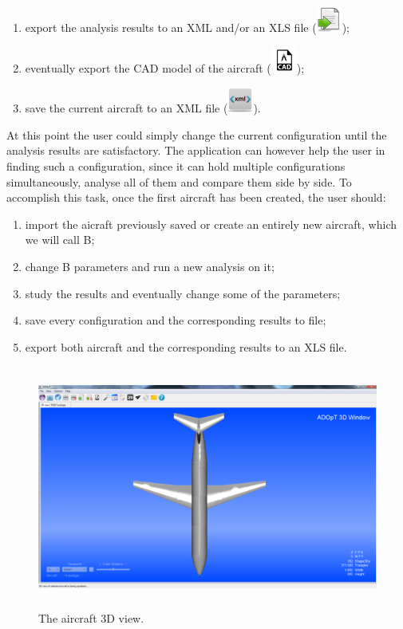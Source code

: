 \begin{enumerate}
	\item export the analysis results to an XML and/or an XLS file \big(\includegraphics[scale=0.4]{Immagini/gui/icons/Export_32x32.png}\big);
	
	\item eventually export the CAD model of the aircraft \big(\includegraphics[scale=1.2]{Immagini/gui/icons/cad_32x32.png}\big);
	\item save the current aircraft to an XML file \big(\includegraphics[scale=0.4]{Immagini/gui/icons/XML_32x32.png}\big).
\end{enumerate}

	
At this point the user could simply change the current configuration until the analysis results are satisfactory. The application can however help the user in finding such a configuration, since it can hold multiple configurations simultaneously, analyse all of them and compare them side by side. To accomplish this task, once the first aircraft has been created, the user should:

\begin{enumerate}
	\item import the aicraft previously saved or create an entirely new aircraft, which we will call B;
	\item change B parameters and run a new analysis on it;
	\item study the results and eventually change some of the parameters;
	\item save every configuration and the corresponding results to file;
	\item export both aircraft and the corresponding results to an XLS file.
\end{enumerate}
	
	\begin{figure}[H]
	\centering
		\includegraphics[height =8cm]{Immagini/gui/cad3.png}
		\caption{The aircraft 3D view.}
	\end{figure}		
%

